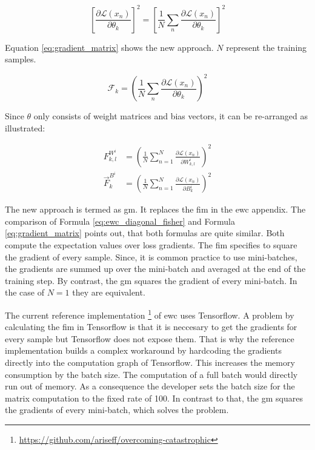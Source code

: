 \begin{equation}
    \left[
        \frac{\partial \mathcal{L}(x_n)}{\partial \theta_k}
        \right]^2
    = 
    \left[
        \frac{1}{N}
        \sum_{n} 
            \frac{\partial \mathcal{L}(x_n)}{\partial \theta_k}
        \right]^2
\end{equation}

Equation \eqref{eq:gradient_matrix} shows the new approach. $N$ represent the training samples.

\begin{equation}
    \mathcal{F}_k =
    \left(
        \frac{1}{N}
        \sum_{n} 
            \frac{\partial \mathcal{L}(x_n)}{\partial \theta_k}
        \right)^2
    \label{eq:gradient_matrix}
\end{equation}

Since $\theta$ only consists of weight matrices and bias vectors, it can be re-arranged as illustrated:

\begin{equation}
    \begin{split}
        F^{W^i}_{k,l} & = 
        \left(
            \frac{1}{N} 
            \sum_{n=1}^{N}
            \frac{\partial \mathcal{L} \left( x_n \right) }{\partial W^i_{k,l}}
        \right)^2
        \\
        \vec{F}^{B^i}_k & = 
        \left(
            \frac{1}{N} 
            \sum_{n=1}^{N} 
            \frac{\partial \mathcal{L} \left( x_n \right) }{\partial B^i_{k}}
        \right)^2
    \end{split}
\end{equation}

The new approach is termed as \acrfull{gm}.
It replaces the \acrshort{fim} in the \acrshort{ewc} appendix.
\newline
The comparison of Formula \ref{eq:ewc_diagonal_fisher} and Formula \ref{eq:gradient_matrix} points out, that both formulas are quite similar.
Both compute the expectation values over loss gradients.
\newline
The \acrshort{fim} specifies to square the gradient of every sample.
Since, it is common practice to use mini-batches, the gradients are summed up over the mini-batch and averaged at the end of the training step.
By contrast, the \acrlong{gm} squares the gradient of every mini-batch.
\newline
In the case of $N=1$ they are equivalent.

The current reference implementation \footnote[1]{\url{https://github.com/ariseff/overcoming-catastrophic}} of \acrshort{ewc} uses Tensorflow.
A problem by calculating the \acrshort{fim} in Tensorflow is that it is neccesary to get the gradients for every sample but Tensorflow does not expose them.
That is why the reference implementation builds a complex workaround by hardcoding the gradients directly into the computation graph of Tensorflow.
This increases the memory consumption by the batch size.
The computation of a full batch would directly run out of memory.
As a consequence the developer sets the batch size for the matrix computation to the fixed rate of 100.
In contrast to that, the \acrlong{gm} squares the gradients of every mini-batch, which solves the problem.
\cite{github_ewc_issue_one}

